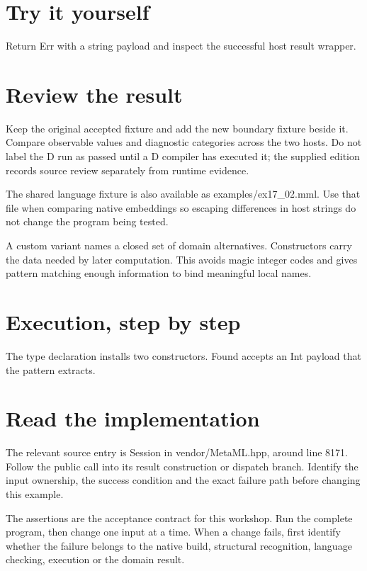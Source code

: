 \section*{Try it yourself}
Return Err with a string payload and inspect the successful host result wrapper.

\section*{Review the result}
Keep the original accepted fixture and add the new boundary fixture beside it. Compare observable values and diagnostic categories across the two hosts. Do not label the D run as passed until a D compiler has executed it; the supplied edition records source review separately from runtime evidence.

The shared language fixture is also available as examples/ex17\_02.mml. Use that file when comparing native embeddings so escaping differences in host strings do not change the program being tested.

\clearpage
{}
A custom variant names a closed set of domain alternatives. Constructors carry the data needed by later computation. This avoids magic integer codes and gives pattern matching enough information to bind meaningful local names.


\section*{Execution, step by step}
The type declaration installs two constructors. Found accepts an Int payload that the pattern extracts.

\section*{Read the implementation}
The relevant source entry is Session in vendor/MetaML.hpp, around line 8171. Follow the public call into its result construction or dispatch branch. Identify the input ownership, the success condition and the exact failure path before changing this example.

The assertions are the acceptance contract for this workshop. Run the complete program, then change one input at a time. When a change fails, first identify whether the failure belongs to the native build, structural recognition, language checking, execution or the domain result.

